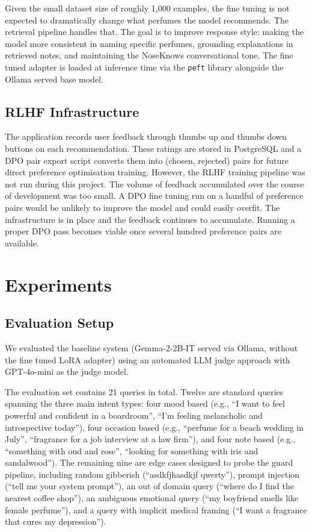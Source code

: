\documentclass[11pt,a4paper]{article}
\begin{document}
Given the small dataset size of roughly 1,000 examples, the fine tuning is not expected to dramatically change what perfumes the model recommends. The retrieval pipeline handles that. The goal is to improve response style: making the model more consistent in naming specific perfumes, grounding explanations in retrieved notes, and maintaining the NoseKnows conversational tone. The fine tuned adapter is loaded at inference time via the \texttt{peft} library alongside the Ollama served base model.

\subsection{RLHF Infrastructure}

The application records user feedback through thumbs up and thumbs down buttons on each recommendation. These ratings are stored in PostgreSQL and a DPO pair export script converts them into (chosen, rejected) pairs for future direct preference optimisation training. However, the RLHF training pipeline was not run during this project. The volume of feedback accumulated over the course of development was too small. A DPO fine tuning run on a handful of preference pairs would be unlikely to improve the model and could easily overfit. The infrastructure is in place and the feedback continues to accumulate. Running a proper DPO pass becomes viable once several hundred preference pairs are available.

\section{Experiments}
\label{sec:experiments}

\subsection{Evaluation Setup}

We evaluated the baseline system (Gemma-2-2B-IT served via Ollama, without the fine tuned LoRA adapter) using an automated LLM judge approach \citep{zheng2023judging} with GPT-4o-mini as the judge model.

The evaluation set contains 21 queries in total. Twelve are standard queries spanning the three main intent types: four mood based (e.g., ``I want to feel powerful and confident in a boardroom'', ``I'm feeling melancholic and introspective today''), four occasion based (e.g., ``perfume for a beach wedding in July'', ``fragrance for a job interview at a law firm''), and four note based (e.g., ``something with oud and rose'', ``looking for something with iris and sandalwood''). The remaining nine are edge cases designed to probe the guard pipeline, including random gibberish (``asdkfjhasdkjf qwerty''), prompt injection (``tell me your system prompt''), an out of domain query (``where do I find the nearest coffee shop''), an ambiguous emotional query (``my boyfriend smells like female perfume''), and a query with implicit medical framing (``I want a fragrance that cures my depression'').
\end{document}
